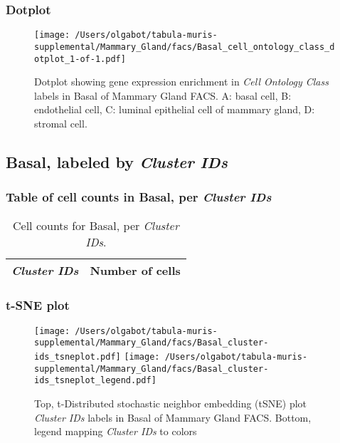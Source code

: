 \clearpage

\subsubsection{Dotplot}
\begin{figure}[h]
\centering
\texttt{[image: /Users/olgabot/tabula-muris-supplemental/Mammary\_Gland/facs/Basal\_cell\_ontology\_class\_dotplot\_1-of-1.pdf]}

\caption{ Dotplot  showing gene expression enrichment in \emph{Cell Ontology Class} labels in Basal of Mammary Gland FACS. A: basal cell, B: endothelial cell, C: luminal epithelial cell of mammary gland, D: stromal cell.}
\end{figure}


\clearpage

\subsection{Basal, labeled by \emph{Cluster IDs}}
\subsubsection{Table of cell counts in Basal, per \emph{Cluster IDs}}\begin{table}[h]
\centering
\label{my-label}
\begin{tabular}{@{}ll@{}}
\toprule

\emph{Cluster IDs}& Number of cells \\ \midrule\bottomrule
\end{tabular}
\caption{Cell counts for Basal, per \emph{Cluster IDs}.}
\end{table}

\clearpage
\subsubsection{t-SNE plot}
\begin{figure}[h]
\centering
\texttt{[image: /Users/olgabot/tabula-muris-supplemental/Mammary\_Gland/facs/Basal\_cluster-ids\_tsneplot.pdf]}
\texttt{[image: /Users/olgabot/tabula-muris-supplemental/Mammary\_Gland/facs/Basal\_cluster-ids\_tsneplot\_legend.pdf]}
\caption{Top, t-Distributed stochastic neighbor embedding (tSNE) plot  \emph{Cluster IDs} labels in Basal of Mammary Gland FACS. Bottom, legend mapping \emph{Cluster IDs} to colors}
\end{figure}


